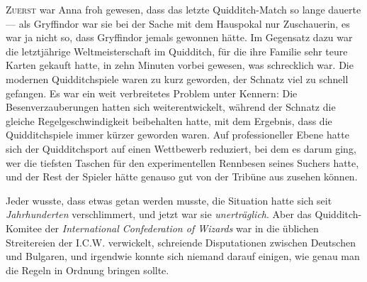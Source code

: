
\lettrine{Z}{uerst} war Anna froh gewesen, dass das letzte Quidditch-Match so lange dauerte — als Gryffindor war sie bei der Sache mit dem Hauspokal nur Zuschauerin, es war ja nicht so, dass Gryffindor jemals gewonnen hätte. Im Gegensatz dazu war die letztjährige Weltmeisterschaft im Quidditch, für die ihre Familie sehr teure Karten gekauft hatte, in zehn Minuten vorbei gewesen, was schrecklich war. Die modernen Quidditchspiele waren zu kurz geworden, der Schnatz viel zu schnell gefangen. Es war ein weit verbreitetes Problem unter Kennern: Die Besenverzauberungen hatten sich weiterentwickelt, während der Schnatz die gleiche Regelgeschwindigkeit beibehalten hatte, mit dem Ergebnis, dass die Quidditchspiele immer kürzer geworden waren.
Auf professioneller Ebene hatte sich der Quidditchsport auf einen Wettbewerb reduziert, bei dem es darum ging, wer die tiefsten Taschen für den experimentellen Rennbesen seines Suchers hatte, und der Rest der Spieler hätte genauso gut von der Tribüne aus zusehen können.

Jeder wusste, dass etwas getan werden musste, die Situation hatte sich seit \emph{Jahrhunderten} verschlimmert, und jetzt war sie \emph{unerträglich}. Aber das Quidditch-Komitee der \emph{International Confederation of Wizards} war in die üblichen Streitereien der I.C.W. verwickelt, schreiende Disputationen zwischen Deutschen und Bulgaren, und irgendwie konnte sich niemand darauf einigen, wie genau man die Regeln in Ordnung bringen sollte.

